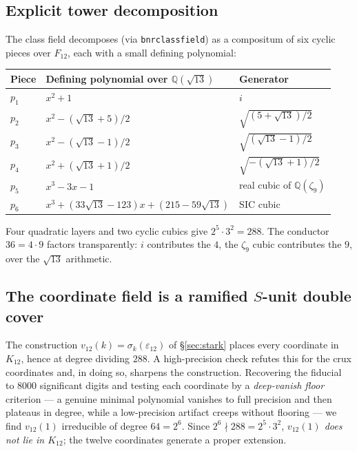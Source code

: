 \documentclass[12pt,a4paper]{article}
\begin{document}
\subsection{Explicit tower decomposition}

The class field decomposes (via \texttt{bnrclassfield}) as a compositum of six
cyclic pieces over $F_{12}$, each with a small defining polynomial:
\begin{center}
\begin{tabular}{@{}lll@{}}
\toprule
\textbf{Piece} & \textbf{Defining polynomial over $\mathbb{Q}(\sqrt{13})$} & \textbf{Generator} \\
\midrule
$p_1$ & $x^2 + 1$ & $i$ \\
$p_2$ & $x^2 - (\sqrt{13}+5)/2$ & $\sqrt{(5+\sqrt{13})/2}$ \\
$p_3$ & $x^2 - (\sqrt{13}-1)/2$ & $\sqrt{(\sqrt{13}-1)/2}$ \\
$p_4$ & $x^2 + (\sqrt{13}+1)/2$ & $\sqrt{-(\sqrt{13}+1)/2}$ \\
$p_5$ & $x^3 - 3x - 1$ & real cubic of $\mathbb{Q}(\zeta_9)$ \\
$p_6$ & $x^3 + (33\sqrt{13}-123)x + (215 - 59\sqrt{13})$ & SIC cubic \\
\bottomrule
\end{tabular}
\end{center}
Four quadratic layers and two cyclic cubics give $2^5\cdot 3^2 = 288$.  The
conductor $36 = 4\cdot 9$ factors transparently: $i$ contributes the $4$, the
$\zeta_9$ cubic contributes the $9$, over the $\sqrt{13}$ arithmetic.

\subsection{The coordinate field is a ramified \texorpdfstring{$S$}{S}-unit double cover}
\label{subsec:doublecover}

The construction $v_{12}(k) = \sigma_k(\varepsilon_{12})$ of \S\ref{sec:stark} places
every coordinate in $K_{12}$, hence at degree dividing $288$.  A high-precision check
refutes this for the crux coordinates and, in doing so, sharpens the construction.
Recovering the fiducial to $8000$ significant digits and testing each coordinate by a
\emph{deep-vanish floor} criterion --- a genuine minimal polynomial vanishes to full
precision and then plateaus in degree, while a low-precision artifact creeps without
flooring --- we find $v_{12}(1)$ irreducible of degree $64 = 2^6$.  Since
$2^6 \nmid 288 = 2^5\cdot 3^2$, \emph{$v_{12}(1)$ does not lie in $K_{12}$}; the twelve
coordinates generate a proper extension.
\end{document}
